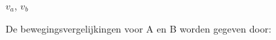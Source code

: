 \begin{exercise}[gevraagd]$v_a$, $v_b$
\end{exercise}

\begin{exercise}[oplossing]De bewegingsvergelijkingen voor A en B worden gegeven door:


\end{exercise}

